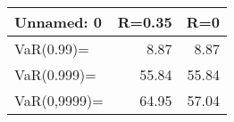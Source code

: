 \begin{tabular}{lrr}
\toprule
   Unnamed: 0 &  R=0.35 &    R=0 \\
\midrule
   VaR(0.99)= &    8.87 &   8.87 \\
  VaR(0.999)= &   55.84 &  55.84 \\
 VaR(0,9999)= &   64.95 &  57.04 \\
\bottomrule
\end{tabular}
